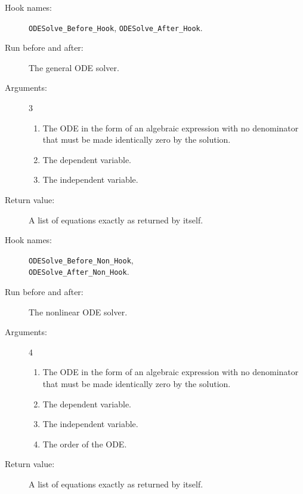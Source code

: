 \noindent\hrulefill

\begin{description}
\item[Hook names:] \texttt{ODESolve\_Before\_Hook},
\texttt{ODESolve\_After\_Hook}.
\item[Run before and after:] The general ODE solver.
\item[Arguments:] 3
\begin{enumerate}
\item The ODE in the form of an algebraic expression with no
denominator that must be made identically zero by the solution.
\item The dependent variable.
\item The independent variable.
\end{enumerate}
\item[Return value:] A list of equations exactly as returned by
 itself.
\end{description}

\noindent\hrulefill

\begin{description}
\item[Hook names:] \texttt{ODESolve\_Before\_Non\_Hook},\\
\texttt{ODESolve\_After\_Non\_Hook}.
\item[Run before and after:] The nonlinear ODE solver.
\item[Arguments:] 4
\begin{enumerate}
\item The ODE in the form of an algebraic expression with no
denominator that must be made identically zero by the solution.
\item The dependent variable.
\item The independent variable.
\item The order of the ODE.
\end{enumerate}
\item[Return value:] A list of equations exactly as returned by
 itself.
\end{description}

\noindent\hrulefill

